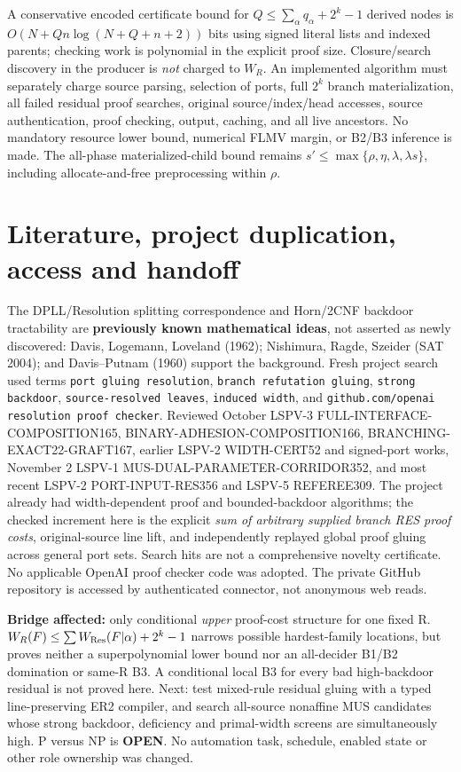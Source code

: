 \documentclass[11pt]{article}
\begin{document}
A conservative encoded certificate bound for $Q\le\sum_\alpha q_\alpha+2^k-1$ derived nodes is $O(N+Qn\log(N+Q+n+2))$ bits using signed literal lists and indexed parents; checking work is polynomial in the explicit proof size. Closure/search discovery in the producer is \emph{not} charged to $W_R$. An implemented algorithm must separately charge source parsing, selection of ports, full $2^k$ branch materialization, all failed residual proof searches, original source/index/head accesses, source authentication, proof checking, output, caching, and all live ancestors. No mandatory resource lower bound, numerical FLMV margin, or B2/B3 inference is made. The all-phase materialized-child bound remains $s'\le\max\{\rho,\eta,\lambda,\lambda s\}$, including allocate-and-free preprocessing within $\rho$.

\section*{Literature, project duplication, access and handoff}
The DPLL/Resolution splitting correspondence and Horn/2CNF backdoor tractability are \textbf{previously known mathematical ideas}, not asserted as newly discovered: Davis, Logemann, Loveland (1962); Nishimura, Ragde, Szeider (SAT 2004); and Davis--Putnam (1960) support the background. Fresh project search used terms \texttt{port gluing resolution}, \texttt{branch refutation gluing}, \texttt{strong backdoor}, \texttt{source-resolved leaves}, \texttt{induced width}, and \texttt{github.com/openai resolution proof checker}. Reviewed October LSPV-3 FULL-INTERFACE-COMPOSITION165, BINARY-ADHESION-COMPOSITION166, BRANCHING-EXACT22-GRAFT167, earlier LSPV-2 WIDTH-CERT52 and signed-port works, November 2 LSPV-1 MUS-DUAL-PARAMETER-CORRIDOR352, and most recent LSPV-2 PORT-INPUT-RES356 and LSPV-5 REFEREE309. The project already had width-dependent proof and bounded-backdoor algorithms; the checked increment here is the explicit \emph{sum of arbitrary supplied branch RES proof costs}, original-source line lift, and independently replayed global proof gluing across general port sets. Search hits are not a comprehensive novelty certificate. No applicable OpenAI proof checker code was adopted. The private GitHub repository is accessed by authenticated connector, not anonymous web reads.

\textbf{Bridge affected:} only conditional \emph{upper} proof-cost structure for one fixed R. $W_R(F)\le\sum W_{\rm Res}(F|\alpha)+2^k-1$ narrows possible hardest-family locations, but proves neither a superpolynomial lower bound nor an all-decider B1/B2 domination or same-R B3. A conditional local B3 for every bad high-backdoor residual is not proved here. Next: test mixed-rule residual gluing with a typed line-preserving ER2 compiler, and search all-source nonaffine MUS candidates whose strong backdoor, deficiency and primal-width screens are simultaneously high. P versus NP is \textbf{OPEN}. No automation task, schedule, enabled state or other role ownership was changed.



\end{document}
